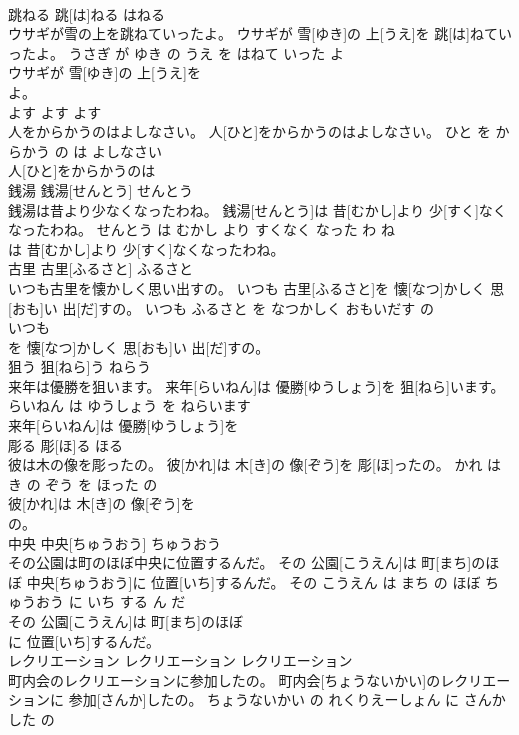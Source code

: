 \documentclass[8pt]{extreport}
\begin{document}
\begin{CJK}{UTF8}{min}
\\	跳ねる	跳[は]ねる	はねる	
\\	ウサギが雪の上を跳ねていったよ。	ウサギが 雪[ゆき]の 上[うえ]を 跳[は]ねていったよ。	うさぎ が ゆき の うえ を はねて いった よ	
\\	ウサギが 雪[ゆき]の 上[うえ]を
\\	よ。			
\\	よす	よす	よす	
\\	人をからかうのはよしなさい。	人[ひと]をからかうのはよしなさい。	ひと を からかう の は よしなさい	
\\	人[ひと]をからかうのは
\\	銭湯	銭湯[せんとう]	せんとう	
\\	銭湯は昔より少なくなったわね。	銭湯[せんとう]は 昔[むかし]より 少[すく]なくなったわね。	せんとう は むかし より すくなく なった わ ね	
\\	は 昔[むかし]より 少[すく]なくなったわね。			
\\	古里	古里[ふるさと]	ふるさと	
\\	いつも古里を懐かしく思い出すの。	いつも 古里[ふるさと]を 懐[なつ]かしく 思[おも]い 出[だ]すの。	いつも ふるさと を なつかしく おもいだす の	
\\	いつも
\\	を 懐[なつ]かしく 思[おも]い 出[だ]すの。			
\\	狙う	狙[ねら]う	ねらう	
\\	来年は優勝を狙います。	来年[らいねん]は 優勝[ゆうしょう]を 狙[ねら]います。	らいねん は ゆうしょう を ねらいます	
\\	来年[らいねん]は 優勝[ゆうしょう]を
\\	彫る	彫[ほ]る	ほる	
\\	彼は木の像を彫ったの。	彼[かれ]は 木[き]の 像[ぞう]を 彫[ほ]ったの。	かれ は き の ぞう を ほった の	
\\	彼[かれ]は 木[き]の 像[ぞう]を
\\	の。			
\\	中央	中央[ちゅうおう]	ちゅうおう	
\\	その公園は町のほぼ中央に位置するんだ。	その 公園[こうえん]は 町[まち]のほぼ 中央[ちゅうおう]に 位置[いち]するんだ。	その こうえん は まち の ほぼ ちゅうおう に いち する ん だ	
\\	その 公園[こうえん]は 町[まち]のほぼ
\\	に 位置[いち]するんだ。			
\\	レクリエーション	レクリエーション	レクリエーション	
\\	町内会のレクリエーションに参加したの。	町内会[ちょうないかい]のレクリエーションに 参加[さんか]したの。	ちょうないかい の れくりえーしょん に さんか した の	

\end{CJK}
\end{document}

